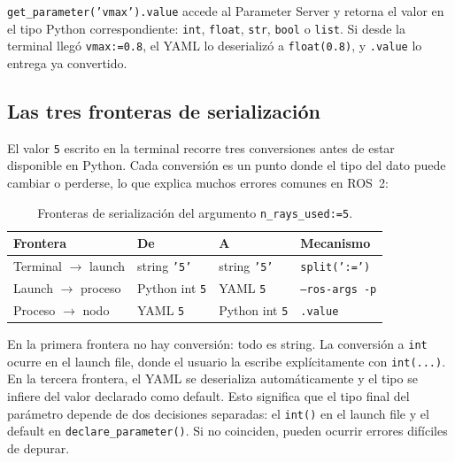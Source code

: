 \texttt{get\_parameter('vmax').value} accede al Parameter Server y retorna el valor en el tipo Python correspondiente: \texttt{int}, \texttt{float}, \texttt{str}, \texttt{bool} o \texttt{list}. Si desde la terminal llegó \texttt{vmax:=0.8}, el YAML lo deserializó a \texttt{float(0.8)}, y \texttt{.value} lo entrega ya convertido.

\subsection{Las tres fronteras de serialización}

El valor \texttt{5} escrito en la terminal recorre tres conversiones antes de estar disponible en Python. Cada conversión es un punto donde el tipo del dato puede cambiar o perderse, lo que explica muchos errores comunes en ROS~2:

\begin{table}[H]
  \centering
  \caption{Fronteras de serialización del argumento \texttt{n\_rays\_used:=5}.}
  \label{tab:fronteras}
  \begin{tabular}{llll}
    \toprule
    Frontera & De & A & Mecanismo \\
    \midrule
    Terminal $\to$ launch & string \texttt{'5'} & string \texttt{'5'} & \texttt{split(':=')} \\
    Launch $\to$ proceso  & Python int \texttt{5}  & YAML \texttt{5} & \texttt{--ros-args -p} \\
    Proceso $\to$ nodo    & YAML \texttt{5} & Python int \texttt{5} & \texttt{.value} \\
    \bottomrule
  \end{tabular}
\end{table}

En la primera frontera no hay conversión: todo es string. La conversión a \texttt{int} ocurre en el launch file, donde el usuario la escribe explícitamente con \texttt{int(...)}. En la tercera frontera, el YAML se deserializa automáticamente y el tipo se infiere del valor declarado como default. Esto significa que el tipo final del parámetro depende de dos decisiones separadas: el \texttt{int()} en el launch file y el default en \texttt{declare\_parameter()}. Si no coinciden, pueden ocurrir errores difíciles de depurar.
